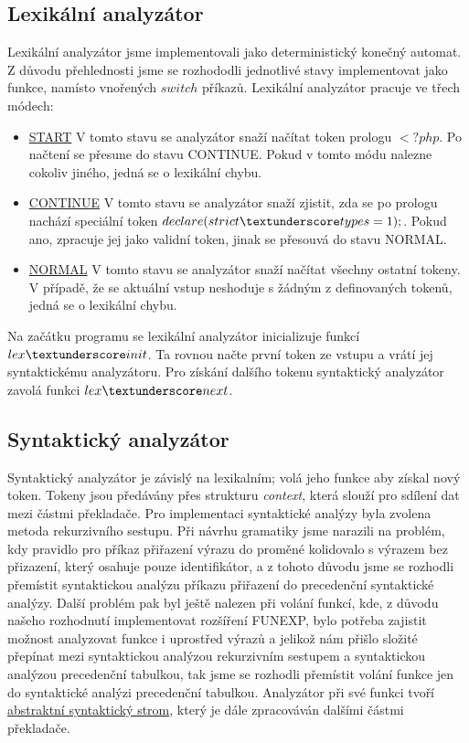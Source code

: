 \documentclass[a4paper, 11pt]{article}
\begin{document}
		\subsection{Lexikální analyzátor}
	Lexikální analyzátor jsme implementovali jako deterministický konečný automat. Z důvodu přehlednosti jsme se rozhododli jednotlivé stavy implementovat 
	jako funkce, namísto vnořených $switch$ příkazů. Lexikální analyzátor pracuje ve třech módech:
	
	\begin{itemize}
		\item \hyperref[lex_START]{START}\newline
			V tomto stavu se analyzátor snaží načítat token prologu $<?php$. Po načtení se přesune do stavu CONTINUE. Pokud v tomto módu nalezne 
			cokoliv jiného, jedná se o lexikální chybu.
		\item \hyperref[lex_CONTINUE]{CONTINUE}\newline
			V tomto stavu se analyzátor snaží zjistit, zda se po prologu nachází speciální token $declare(strict \textunderscore types=1);$. Pokud ano, 
			zpracuje jej jako validní token, jinak se přesouvá do stavu NORMAL.
		\item \hyperref[lex_NORMAL]{NORMAL}\newline
			V tomto stavu se analyzátor snaží načítat všechny ostatní tokeny. V případě, že se aktuální vstup neshoduje s žádným z definovaných tokenů, 
			jedná se o lexikální chybu.
	\end{itemize}
	
	Na začátku programu se lexikální analyzátor inicializuje funkcí $lex \textunderscore init$. Ta rovnou načte první token ze vstupu a vrátí jej syntaktickému 
	analyzátoru. Pro získání dalšího tokenu syntaktický analyzátor zavolá funkci $lex \textunderscore next$.
	\subsection{Syntaktický analyzátor}
	Syntaktický analyzátor je závislý na lexikalním; volá jeho funkce aby získal nový token. Tokeny jsou předávány přes strukturu \textit{context}, která slouží pro 
	sdílení dat mezi částmi překladače. Pro implementaci syntaktické analýzy byla zvolena metoda rekurzivního sestupu. Při návrhu gramatiky jsme narazili 
	na problém, kdy pravidlo pro příkaz přiřazení výrazu do proměné kolidovalo s výrazem bez přizazení, který osahuje pouze identifikátor, a z tohoto důvodu 
	jsme se rozhodli přemístit syntaktickou analýzu příkazu přiřazení do precedenční syntaktické analýzy. Další problém pak byl ještě nalezen při volání funkcí, 
	kde, z důvodu našeho rozhodnutí implementovat rozšíření FUNEXP, bylo potřeba zajistit možnost analyzovat funkce i uprostřed výrazů a jelikož nám přišlo 
	složité přepínat mezi syntaktickou analýzou rekurzivním sestupem a syntaktickou analýzou precedenční tabulkou, tak jsme se rozhodli přemístit volání funkce 
	jen do syntaktické analýzi precedenční tabulkou. Analyzátor při své funkci tvoří \hyperref[abstrtree]{abstraktní syntaktický strom}, který je dále zpracováván 
	dalšími částmi překladače.
\end{document}

